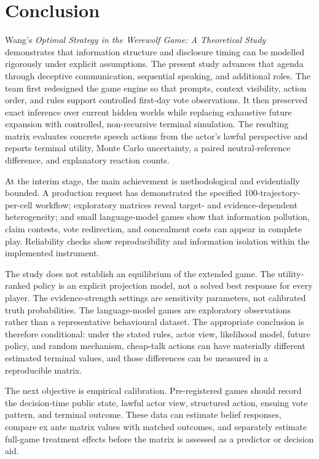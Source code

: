 \documentclass[11pt,a4paper]{article}
\begin{document}
\section{Conclusion}

Wang's \emph{Optimal Strategy in the Werewolf Game: A Theoretical Study} demonstrates that information structure and disclosure timing can be modelled rigorously under explicit assumptions. The present study advances that agenda through deceptive communication, sequential speaking, and additional roles. The team first redesigned the game engine so that prompts, context visibility, action order, and rules support controlled first-day vote observations. It then preserved exact inference over current hidden worlds while replacing exhaustive future expansion with controlled, non-recursive terminal simulation. The resulting matrix evaluates concrete speech actions from the actor's lawful perspective and reports terminal utility, Monte Carlo uncertainty, a paired neutral-reference difference, and explanatory reaction counts.

At the interim stage, the main achievement is methodological and evidentially bounded. A production request has demonstrated the specified 100-trajectory-per-cell workflow; exploratory matrices reveal target- and evidence-dependent heterogeneity; and small language-model games show that information pollution, claim contests, vote redirection, and concealment costs can appear in complete play. Reliability checks show reproducibility and information isolation within the implemented instrument.

The study does not establish an equilibrium of the extended game. The utility-ranked policy is an explicit projection model, not a solved best response for every player. The evidence-strength settings are sensitivity parameters, not calibrated truth probabilities. The language-model games are exploratory observations rather than a representative behavioural dataset. The appropriate conclusion is therefore conditional: under the stated rules, actor view, likelihood model, future policy, and random mechanism, cheap-talk actions can have materially different estimated terminal values, and those differences can be measured in a reproducible matrix.

The next objective is empirical calibration. Pre-registered games should record the decision-time public state, lawful actor view, structured action, ensuing vote pattern, and terminal outcome. These data can estimate belief responses, compare ex ante matrix values with matched outcomes, and separately estimate full-game treatment effects before the matrix is assessed as a predictor or decision aid.
\end{document}
